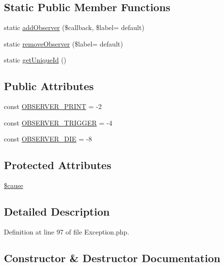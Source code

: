 \subsection*{Static Public Member Functions}
\begin{DoxyCompactItemize}
\item 
static \hyperlink{classPEAR__Exception_a02492e33d5af1e70e864d4269f6c5358}{add\+Observer} (\$callback, \$label= \textquotesingle{}default\textquotesingle{})
\item 
static \hyperlink{classPEAR__Exception_af5655bcf96398482199620196db0f8cb}{remove\+Observer} (\$label= \textquotesingle{}default\textquotesingle{})
\item 
static \hyperlink{classPEAR__Exception_af81b4e556fe7142e45ed9117b8cfb044}{get\+Unique\+Id} ()
\end{DoxyCompactItemize}
\subsection*{Public Attributes}
\begin{DoxyCompactItemize}
\item 
const \hyperlink{classPEAR__Exception_afaa71d35f3fab453da2cef325b210423}{O\+B\+S\+E\+R\+V\+E\+R\+\_\+\+P\+R\+I\+NT} = -\/2
\item 
const \hyperlink{classPEAR__Exception_a0bf6d43a80c7f3bc2c7cfae062ff4477}{O\+B\+S\+E\+R\+V\+E\+R\+\_\+\+T\+R\+I\+G\+G\+ER} = -\/4
\item 
const \hyperlink{classPEAR__Exception_ad3ee7214450c1e14de99dbde12b8a60c}{O\+B\+S\+E\+R\+V\+E\+R\+\_\+\+D\+IE} = -\/8
\end{DoxyCompactItemize}
\subsection*{Protected Attributes}
\begin{DoxyCompactItemize}
\item 
\hyperlink{classPEAR__Exception_a7570906af734c282bcde649449bdbfdb}{\$cause}
\end{DoxyCompactItemize}


\subsection{Detailed Description}


Definition at line 97 of file Exception.\+php.



\subsection{Constructor \& Destructor Documentation}
